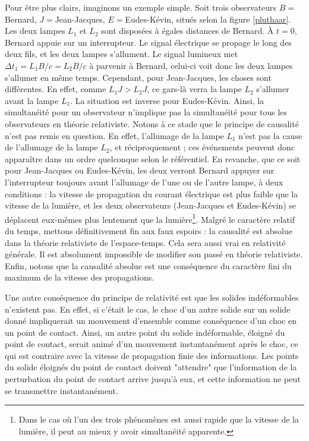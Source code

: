 		Pour être plus clairs, imaginons un exemple simple. Soit trois observateurs $B=$Bernard, $J=$Jean-Jacques, $E=$Eudes-Kévin, situés selon la figure \ref{pluthaar}. Les deux lampes $L_1$ et $L_2$ sont disposées à égales distances de Bernard. À $t=0$, Bernard appuie sur un interrupteur. Le signal électrique se propage le long des deux fils, et les deux lampes s'allument. Le signal lumineux met $\Delta t_1=L_1B/c=L_2B/c$ à parvenir à Bernard, celui-ci voit donc les deux lampes s'allumer en même temps. Cependant, pour Jean-Jacques, les choses sont différentes. En effet, comme $L_1J>L_2J$, ce gars-là verra la lampe $L_2$ s'allumer avant la lampe $L_1$. La situation est inverse pour Eudes-Kévin. Ainsi, la simultanéité pour un observateur n'implique pas la simultanéité pour tous les observateurs en théorie relativiste. Notons à ce stade que le principe de causalité n'est pas remis en question. En effet, l'allumage de la lampe $L_1$ n'est pas la cause de l'allumage de la lampe $L_2$, et réciproquement ; ces événements peuvent donc apparaître dans un ordre quelconque selon le référentiel. En revanche, que ce soit pour Jean-Jacques ou Eudes-Kévin, les deux verront Bernard appuyer sur l'interrupteur toujours avant l'allumage de l'une ou de l'autre lampe, à deux conditions : la vitesse de propagation du courant électrique est plus faible que la vitesse de la lumière, et les deux observateurs (Jean-Jacques et Eudes-Kévin) se déplacent eux-mêmes plus lentement que la lumière\footnote{Dans le cas où l'un des trois phénomènes est aussi rapide que la vitesse de la lumière, il peut au mieux y avoir simultanéité apparente.}. Malgré le caractère relatif du temps, mettons définitivement fin aux faux espoirs : la causalité est absolue dans la théorie relativiste de l'espace-temps. Cela sera aussi vrai en relativité générale. Il est absolument impossible de modifier son passé en théorie relativiste. Enfin, notons que la causalité absolue est une conséquence du caractère fini du maximum de la vitesse des propagations.

		Une autre conséquence du principe de relativité est que les solides indéformables n'existent pas. En effet, si c'était le cas, le choc d'un autre solide sur un solide donné impliquerait un mouvement d'ensemble comme conséquence d'un choc en un point de contact. Ainsi, un autre point du solide indéformable, éloigné du point de contact, serait animé d'un mouvement instantanément après le choc, ce qui est contraire avec la vitesse de propagation finie des informations. Les points du solide éloignés du point de contact doivent "attendre" que l'information de la perturbation du point de contact arrive jusqu'à eux, et cette information ne peut se transmettre instantanément.

